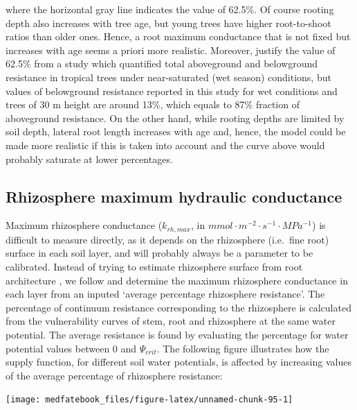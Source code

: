 \documentclass[]{book}
\begin{document}
where the horizontal gray line indicates the value of 62.5\%. Of course rooting depth also increases with tree age, but young trees have higher root-to-shoot ratios than older ones. Hence, a root maximum conductance that is not fixed but increases with age seems a priori more realistic. Moreover, \citet{Christoffersen2016} justify the value of 62.5\% from a study which quantified total aboveground and belowground resistance in tropical trees \citep{Fisher2006} under near-saturated (wet season) conditions, but values of belowground resistance reported in this study for wet conditions and trees of 30 m height are around 13\%, which equals to 87\% fraction of aboveground resistance. On the other hand, while rooting depths are limited by soil depth, lateral root length increases with age and, hence, the model could be made more realistic if this is taken into account and the curve above would probably saturate at lower percentages.

\hypertarget{rhizosphere-maximum-hydraulic-conductance}{%
\subsection{Rhizosphere maximum hydraulic conductance}\label{rhizosphere-maximum-hydraulic-conductance}}

Maximum rhizosphere conductance (\(k_{rh, max}\), in \(mmol \cdot m^{-2} \cdot s^{-1} \cdot MPa^{-1}\)) is difficult to measure directly, as it depends on the rhizosphere (i.e.~fine root) surface in each soil layer, and will probably always be a parameter to be calibrated. Instead of trying to estimate rhizosphere surface from root architecture \citep{Sperry1998}, we follow \citet{Sperry2016a} and determine the maximum rhizosphere conductance in each layer from an inputed `average percentage rhizosphere resistance'. The percentage of continuum resistance corresponding to the rhizosphere is calculated from the vulnerability curves of stem, root and rhizosphere at the same water potential. The average resistance is found by evaluating the percentage for water potential values between 0 and \(\Psi_{crit}\). The following figure illustrates how the supply function, for different soil water potentials, is affected by increasing values of the average percentage of rhizosphere resistance:

\begin{center}\texttt{[image: medfatebook\_files/figure-latex/unnamed-chunk-95-1]} \end{center}
\end{document}
